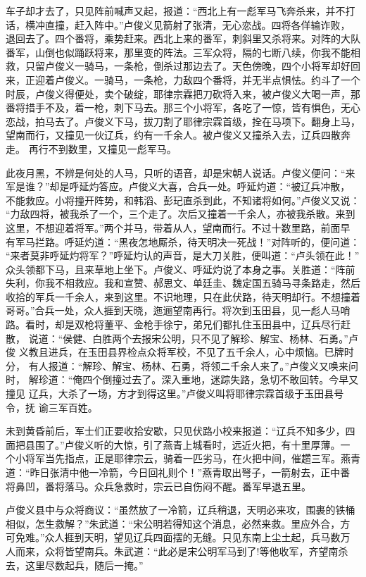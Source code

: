 车子却才去了，只见阵前喊声又起，报道：“西北上有一彪军马飞奔杀来，并不打
话，横冲直撞，赶入阵中。”卢俊义见箭射了张清，无心恋战。四将各佯输诈败，
退回去了。四个番将，乘势赶来。西北上来的番军，刺斜里又杀将来。对阵的大队
番军，山倒也似踊跃将来，那里变的阵法。三军众将，隔的七断八续，你我不能相
救，只留卢俊义一骑马，一条枪，倒杀过那边去了。天色傍晚，四个小将军却好回
来，正迎着卢俊义。一骑马，一条枪，力敌四个番将，并无半点惧怯。约斗了一个
时辰，卢俊义得便处，卖个破绽，耶律宗霖把刀砍将入来，被卢俊义大喝一声，那
番将措手不及，着一枪，刺下马去。那三个小将军，各吃了一惊，皆有惧色，无心
恋战，拍马去了。卢俊义下马，拔刀割了耶律宗霖首级，拴在马项下。翻身上马，
望南而行，又撞见一伙辽兵，约有一千余人。被卢俊义又撞杀入去，辽兵四散奔走。
再行不到数里，又撞见一彪军马。

此夜月黑，不辨是何处的人马，只听的语音，却是宋朝人说话。卢俊义便问：“来
军是谁？”却是呼延灼答应。卢俊义大喜，合兵一处。呼延灼道：“被辽兵冲散，
不能救应。小将撞开阵势，和韩滔、彭玘直杀到此，不知诸将如何。”卢俊义又说：
“力敌四将，被我杀了一个，三个走了。次后又撞着一千余人，亦被我杀散。来到
这里，不想迎着将军。”两个并马，带着从人，望南而行。不过十数里路，前面早
有军马拦路。呼延灼道：“黑夜怎地厮杀，待天明决一死战！”对阵听的，便问道：
“来者莫非呼延灼将军？”呼延灼认的声音，是大刀关胜，便叫道：“卢头领在此！”
众头领都下马，且来草地上坐下。卢俊义、呼延灼说了本身之事。关胜道：“阵前
失利，你我不相救应。我和宣赞、郝思文、单廷圭、魏定国五骑马寻条路走，然后
收拾的军兵一千余人，来到这里。不识地理，只在此伏路，待天明却行。不想撞着
哥哥。”合兵一处，众人捱到天晓，迤逦望南再行。将次到玉田县，见一彪人马哨
路。看时，却是双枪将董平、金枪手徐宁，弟兄们都扎住玉田县中，辽兵尽行赶散，
说道：“侯健、白胜两个去报宋公明，只不见了解珍、解宝、杨林、石勇。”卢俊
义教且进兵，在玉田县界检点众将军校，不见了五千余人，心中烦恼。巳牌时分，
有人报道：“解珍、解宝、杨林、石勇，将领二千余人来了。”卢俊义又唤来问时，
解珍道：“俺四个倒撞过去了。深入重地，迷踪失路，急切不敢回转。今早又撞见
辽兵，大杀了一场，方才到得这里。”卢俊义叫将耶律宗霖首级于玉田县号令，抚
谕三军百姓。

未到黄昏前后，军士们正要收拾安歇，只见伏路小校来报道：“辽兵不知多少，四
面把县围了。”卢俊义听的大惊，引了燕青上城看时，远近火把，有十里厚薄。一
个小将军当先指点，正是耶律宗云，骑着一匹劣马，在火把中间，催趱三军。燕青
道：“昨日张清中他一冷箭，今日回礼则个！”燕青取出弩子，一箭射去，正中番
将鼻凹，番将落马。众兵急救时，宗云已自伤闷不醒。番军早退五里。

卢俊义县中与众将商议：“虽然放了一冷箭，辽兵稍退，天明必来攻，围裹的铁桶
相似，怎生救解？”朱武道：“宋公明若得知这个消息，必然来救。里应外合，方
可免难。”众人捱到天明，望见辽兵四面摆的无缝。只见东南上尘土起，兵马数万
人而来，众将皆望南兵。朱武道：“此必是宋公明军马到了!等他收军，齐望南杀
去，这里尽数起兵，随后一掩。”


